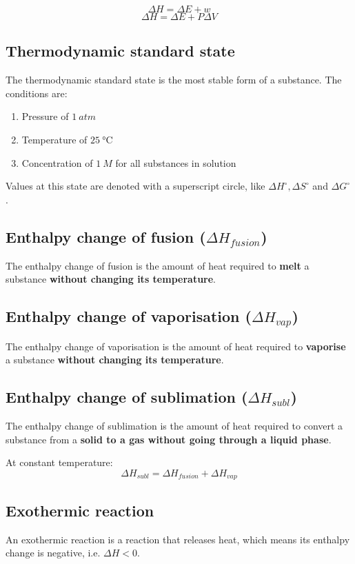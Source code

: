 \documentclass[11pt]{article}
\begin{document}
\[\Delta H = \Delta E + w\]
\[\Delta H = \Delta E + P \Delta V\]

\newpage
\subsection{Thermodynamic standard state}
\label{sec:orgecce289}
The thermodynamic standard state is the most stable form of a substance. The conditions are:
\begin{enumerate}
\item Pressure of \(\qty{1}{\unit{atm}}\)
\item Temperature of \(\qty{25}{\unit{\degreeCelsius}}\)
\item Concentration of \(\qty{1}{\unit{M}}\) for all substances in solution
\end{enumerate}

Values at this state are denoted with a superscript circle, like \(\Delta H^\circ, \Delta S^\circ\) and \(\Delta G^\circ\).
\subsection{Enthalpy change of fusion (\(\Delta H_{fusion}\))}
\label{sec:orgb9e19fd}
The enthalpy change of fusion is the amount of heat required to \textbf{melt} a substance \textbf{without changing its temperature}.
\subsection{Enthalpy change of vaporisation (\(\Delta H_{vap}\))}
\label{sec:orgd11fa51}
The enthalpy change of vaporisation is the amount of heat required to \textbf{vaporise} a substance \textbf{without changing its temperature}.
\subsection{Enthalpy change of sublimation (\(\Delta H_{subl}\))}
\label{sec:org5fe4b40}
The enthalpy change of sublimation is the amount of heat required to convert a substance from a \textbf{solid to a gas without going through a liquid phase}.


At constant temperature:
\[\Delta H_{subl} = \Delta H_{fusion} + \Delta H_{vap}\]
\subsection{Exothermic reaction}
\label{sec:org5d9e7dd}
An exothermic reaction is a reaction that releases heat, which means its enthalpy change is negative, i.e. \(\Delta H < 0\).
\end{document}
